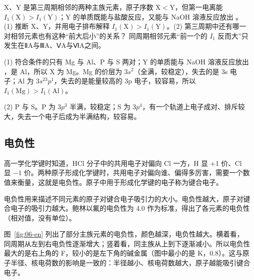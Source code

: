 \begin{liti}[综合]
X、Y 是第三周期相邻的两种主族元素，原子序数 X$<$Y，但第一电离能 $I_1(\text{X})>I_1(\text{Y})$；Y 的单质既能与盐酸反应，又能与 NaOH 溶液反应放出 。(1) 推断 X、Y，并用电子排布解释 $I_1(\text{X})>I_1(\text{Y})$。(2) 第三周期中还有哪一对相邻元素也有这种“前大后小”的关系？
\tcblower
\silu 同周期相邻元素“前一个的 $I_1$ 反而大”只发生在ⅡA与ⅢA、ⅤA与ⅥA之间。\par
\jie (1) 符合条件的只有 Mg 与 Al、P 与 S 两对；Y 的单质能与 NaOH 溶液反应放出 ，是 Al，所以 X 为 Mg。Mg 的价层为 $3s^2$（全满，较稳定），失去的是 3s 电子；Al 为 $3s^23p^1$，失去的是能量较高的 3p 电子，较容易，所以 $I_1(\text{Mg})>I_1(\text{Al})$。\par
(2) P 与 S。P 为 $3p^3$ 半满，较稳定；S 为 $3p^4$，有一个轨道上电子成对、排斥较大，失去一个电子后成为半满结构，较容易。
\end{liti}

\subsection{电负性}
高一学化学键时知道，HCl 分子中的共用电子对偏向 Cl 一方，H 显 +1 价、Cl 显 $-1$ 价。两种原子形成化学键时，共用电子对偏向谁、偏得多厉害，需要一个数值来衡量，这就是电负性。原子中用于形成化学键的电子称为键合电子。

\begin{gainian}[电负性]
电负性用来描述不同元素的原子对键合电子吸引力的大小。电负性越大，原子对键合电子的吸引力越大。鲍林以氟的电负性为 4.0 作为标准，得出了各元素的电负性（相对值，没有单位）。
\end{gainian}

图~\ref{fig:06-en} 列出了部分主族元素的电负性，颜色越深，电负性越大。横着看，同周期从左到右电负性逐渐增大；竖着看，同主族从上到下逐渐减小。所以电负性最大的是右上角的 F，较小的是左下角的碱金属（图中最小的是 K，0.8）。这与原子半径、核电荷数的影响是一致的：半径越小、核电荷数越大，原子越能吸引键合电子。


